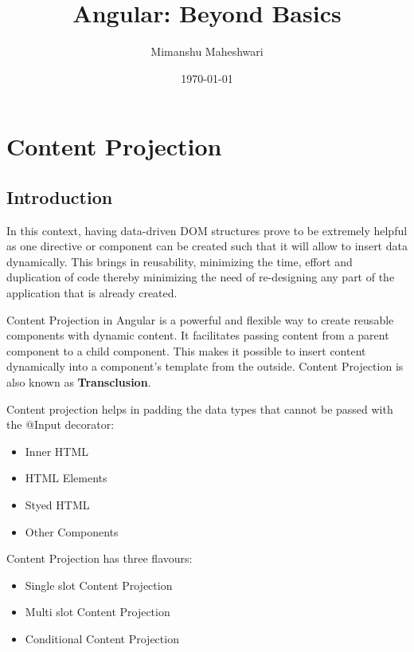 \documentclass{report}
\title{\textbf{Angular}: Beyond Basics}
\author{Mimanshu Maheshwari}
\date{\today}
\begin{document}
\maketitle
\tableofcontents
\listoffigures

\chapter{Content Projection}
\section{Introduction}
In this context, having data-driven DOM structures prove to be extremely helpful as one directive or component can be created such that it will allow to insert data dynamically.
This brings in reusability, minimizing the time, effort and duplication of code thereby minimizing the need of re-designing any part of the application that is already created. 

Content Projection in Angular is a powerful and flexible way to create reusable components with dynamic content.
It facilitates passing content from a parent component to a child component.
This makes it possible to insert content dynamically into a component’s template from the outside.
Content Projection is also known as \textbf{Transclusion}. 

Content projection helps in padding the data types that cannot be passed with the @Input decorator:  
\begin{itemize}
	\item Inner HTML
	\item HTML Elements
	\item Styed HTML
	\item Other Components
\end{itemize}
Content Projection has three flavours: 
\begin{itemize}
	\item Single slot Content Projection
	\item Multi slot Content Projection
	\item Conditional Content Projection
\end{itemize}
\end{document}
